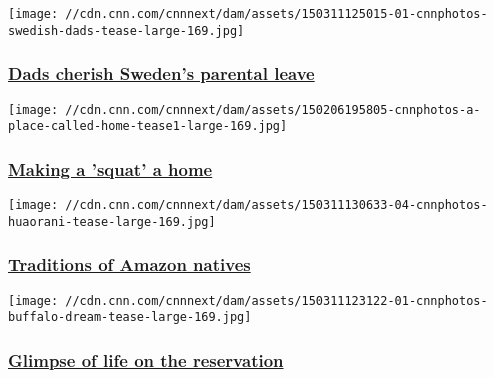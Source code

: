 \href{/2015/04/05/living/cnnphotos-swedish-dads-parental-leave/index.html}{}

\texttt{[image: //cdn.cnn.com/cnnnext/dam/assets/150311125015-01-cnnphotos-swedish-dads-tease-large-169.jpg]}

\hypertarget{dads-cherish-swedens-parental-leave}{%
\subsubsection{\texorpdfstring{\href{/2015/04/05/living/cnnphotos-swedish-dads-parental-leave/index.html}{Dads
cherish Sweden's parental
leave}}{Dads cherish Sweden's parental leave}}\label{dads-cherish-swedens-parental-leave}}

\href{/2015/02/08/living/cnnphotos-a-place-called-home/index.html}{}

\texttt{[image: //cdn.cnn.com/cnnnext/dam/assets/150206195805-cnnphotos-a-place-called-home-tease1-large-169.jpg]}

\hypertarget{making-a-squat-a-home}{%
\subsubsection{\texorpdfstring{\href{/2015/02/08/living/cnnphotos-a-place-called-home/index.html}{Making
a 'squat' a
home}}{Making a 'squat' a home}}\label{making-a-squat-a-home}}

\href{/2015/03/31/world/cnnphotos-huaorani-rainforest-ecuador/index.html}{}

\texttt{[image: //cdn.cnn.com/cnnnext/dam/assets/150311130633-04-cnnphotos-huaorani-tease-large-169.jpg]}

\hypertarget{traditions-of-amazon-natives-}{%
\subsubsection{\texorpdfstring{\href{/2015/03/31/world/cnnphotos-huaorani-rainforest-ecuador/index.html}{Traditions
of Amazon natives
}}{Traditions of Amazon natives }}\label{traditions-of-amazon-natives-}}

\href{/2015/03/29/living/cnnphotos-montana-indian-reservation/index.html}{}

\texttt{[image: //cdn.cnn.com/cnnnext/dam/assets/150311123122-01-cnnphotos-buffalo-dream-tease-large-169.jpg]}

\hypertarget{glimpse-of-life-on-the-reservation}{%
\subsubsection{\texorpdfstring{\href{/2015/03/29/living/cnnphotos-montana-indian-reservation/index.html}{Glimpse
of life on the
reservation}}{Glimpse of life on the reservation}}\label{glimpse-of-life-on-the-reservation}}

